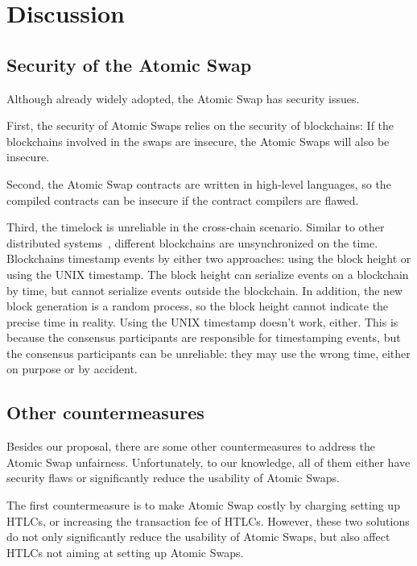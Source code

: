 \section{Discussion}
\label{sec:discussion}

\subsection{Security of the Atomic Swap}

Although already widely adopted, the Atomic Swap has security issues.

First, the security of Atomic Swaps relies on the security of blockchains:
If the blockchains involved in the swaps are insecure, the Atomic Swaps will also be insecure.

Second, the Atomic Swap contracts are written in high-level languages, so the compiled contracts can be insecure if the contract compilers are flawed.

Third, the timelock is unreliable in the cross-chain scenario.
Similar to other distributed systems~\cite{coulouris2012distributed}, different blockchains are unsynchronized on the time.
Blockchains timestamp events by either two approaches: using the block height or using the UNIX timestamp.
The block height can serialize events on a blockchain by time, but cannot serialize events outside the blockchain.
In addition, the new block generation is a random process, so the block height cannot indicate the precise time in reality.
Using the UNIX timestamp doesn't work, either.
This is because the consensus participants are responsible for timestamping events, but the consensus participants can be unreliable:
they may use the wrong time, either on purpose or by accident.


\subsection{Other countermeasures}

Besides our proposal, there are some other countermeasures to address the Atomic Swap unfairness.
Unfortunately, to our knowledge, all of them either have security flaws or significantly reduce the usability of Atomic Swaps.

The first countermeasure is to make Atomic Swap costly by charging setting up HTLCs, or increasing the transaction fee of HTLCs.
However, these two solutions do not only significantly reduce the usability of Atomic Swaps, but also affect HTLCs not aiming at setting up Atomic Swaps.

